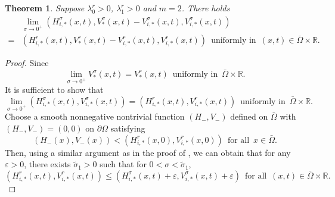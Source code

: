 \documentclass[11pt,reqno]{amsart}
\newtheorem{theorem}{Theorem}[section]
\numberwithin{equation}{section}
\begin{document}
\begin{theorem}
Suppose $\lambda_{0}^{r}>0$, $\lambda_{1}^{r}>0$ and  $m=2$. There holds
\begin{equation*}
\begin{aligned}
&\lim_{\sigma \to 0^{+}} \left(H^{\sigma}_{i,*}(x,t),V^{\sigma}_{*}(x,t)-V^{\sigma}_{i,*}(x,t),V^{\sigma}_{i,*}(x,t)\right) \\
=&
(H_{i,*}^{r}(x,t), V^{r}_{*}(x,t)- V_{i,*}^{r}(x,t), V_{i,*}^{r}(x,t))\enspace \text{uniformly in}\enspace  (x,t)\in\bar{\Omega}\times\mathbb{R}.
\end{aligned}
\end{equation*}
\end{theorem}

\begin{proof}
Since
\begin{equation*}
\lim_{\sigma \to 0^{+}} V^{\sigma}_{*}(x,t) = V^{r}_{*}(x,t) \enspace \text{uniformly in}\enspace \bar{\Omega}\times\mathbb{R}.
\end{equation*}
%
%
It is sufficient to show that
\begin{equation*}
\lim_{\sigma \to 0^{+}} \left(H^{\sigma}_{i,*}(x,t),V^{\sigma}_{i,*}(x,t)\right)
=
( H_{i,*}^{r}(x,t), V_{i,*}^{r}(x,t))\enspace \text{uniformly in}\enspace  \bar{\Omega}\times\mathbb{R}.
\end{equation*}
%
%
Choose a smooth nonnegative nontrivial function $(H_{-},V_{-})$ defined on $\bar{\Omega}$ with $(H_{-},V_{-})=(0,0)$ on $\partial\Omega$ satisfying
\begin{equation*}
(H_{-}(x),V_{-}(x)) < \left( H_{i,*}^{r}(x,0), V_{i,*}^{r}(x,0) \right)
\enspace \text{for all} \enspace x\in\bar{\Omega}.
\end{equation*}
Then, using a similar argument as in the proof of  \cite[Theorem C]{SX}, we can obtain that for any $\varepsilon>0$, there exists $\tilde\sigma_{1}>0$  such that for $0< \sigma < \tilde\sigma_{1}$,
\begin{equation*}
(H_{i,*}^{r}(x,t), V_{i,*}^{r}(x,t))
\leq
(H_{i,*}^{\sigma}(x,t) + \varepsilon, V_{i,*}^{\sigma}(x,t) + \varepsilon)
\enspace \text{for all} \enspace (x,t)\in\bar{\Omega}\times\mathbb{R}.
\end{equation*}



\end{proof}
\end{document}
